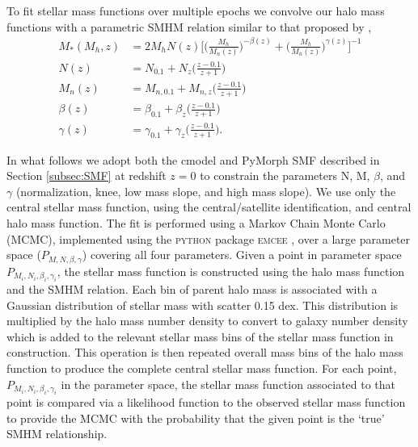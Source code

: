 To fit stellar mass functions over multiple epochs we convolve our halo mass functions with a parametric SMHM relation similar to that proposed by \cite{Moster2010},
\begin{equation}
\label{eqn:MosAbn}
\begin{split}
M_*(M_h, z) &= 2M_hN(z)\Big[ \Big( \frac{M_h}{M_{n}(z)}\Big) ^{- \beta(z)} + \Big( \frac{M_h}{M_{n}(z)}\Big)^{\gamma(z)} \Big ]^{-1}\\
N(z) &= N_{0.1} +N_z\Big(\frac{z-0.1}{z+1}\Big)\\
M_{n}(z) &= M_{n,0.1} +M_{n,z}\Big(\frac{z-0.1}{z+1}\Big)\\
\beta(z) &= \beta_{0.1} +\beta_z\Big(\frac{z-0.1}{z+1}\Big)\\
\gamma(z) &= \gamma_{0.1} +\gamma_z\Big(\frac{z-0.1}{z+1}\Big).
\end{split}
\end{equation}

In what follows we adopt both the cmodel and PyMorph SMF described in Section \ref{subsec:SMF} at redshift $z=0$ to constrain the parameters N, M, $\beta$, and $\gamma$ (normalization, knee, low mass slope, and high mass slope). We use only the central stellar mass function, using the \cite{Yang2012EvolutionHalos} central/satellite identification, and central halo mass function. The fit is performed using a Markov Chain Monte Carlo (MCMC), implemented using the \textsc{python} package \textsc{emcee} \citep{Foreman-Mackey2013Emcee:Hammer}, over a large parameter space ($P_{M, N, \beta, \gamma}$) covering all four parameters. Given a point in parameter space $P_{M_i, N_i, \beta_i, \gamma_i}$, the stellar mass function is constructed using the halo mass function and the SMHM relation. Each bin of parent halo mass is associated with a Gaussian distribution of stellar mass with scatter 0.15 dex. This distribution is multiplied by the halo mass number density to convert to galaxy number density which is added to the relevant stellar mass bins of the stellar mass function in construction. This operation is then repeated overall mass bins of the halo mass function to produce the complete central stellar mass function. For each point, $P_{M_i, N_i, \beta_i, \gamma_i}$ in the parameter space, the stellar mass function associated to that point is compared via a likelihood function to the observed stellar mass function to provide the MCMC with the probability that the given point is the `true' SMHM relationship. 

